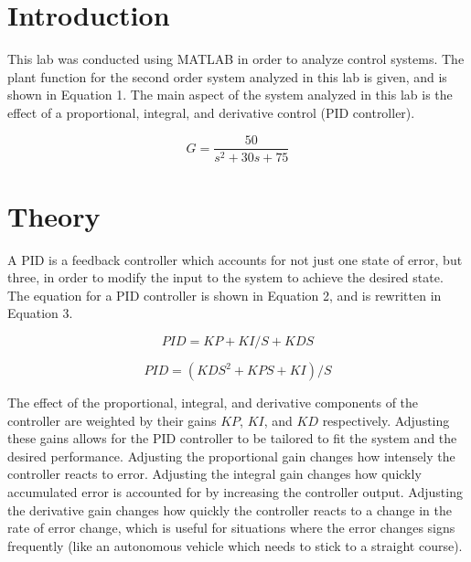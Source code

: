 \documentclass[12pt]{article}
\begin{document}
\newpage



\section*{\fontsize{12}{12}\selectfont \large Introduction}
This lab was conducted using MATLAB in order to analyze control systems. The plant function for the second order system analyzed in this lab is given, and is shown in Equation 1. The main aspect of the system analyzed in this lab is the effect of a proportional, integral, and derivative control (PID controller).

\begin{equation}
G = \frac{50}{s^{2}+30s+75}
\end{equation}



\section*{\fontsize{12}{12}\selectfont \large Theory}
A PID is a feedback controller which accounts for not just one state of error, but three, in order to modify the input to the system to achieve the desired state. The equation for a PID controller is shown in Equation 2, and is rewritten in Equation 3.
\bigskip

\begin{equation}
PID= KP + KI/S + KD S 
\end{equation}

\begin{equation}
PID= (KD S^2 + KP S + KI)/S
\end{equation}
\bigskip

The effect of the proportional, integral, and derivative components of the controller are weighted by their gains $KP$, $KI$, and $KD$ respectively. Adjusting these gains allows for the PID controller to be tailored to fit the system and the desired performance. Adjusting the proportional gain changes how intensely the controller reacts to error. Adjusting the integral gain changes how quickly accumulated error is accounted for by increasing the controller output. Adjusting the derivative gain changes how quickly the controller reacts to a change in the rate of error change, which is useful for situations where the error changes signs frequently (like an autonomous vehicle which needs to stick to a straight course).
\bigskip
\end{document}
